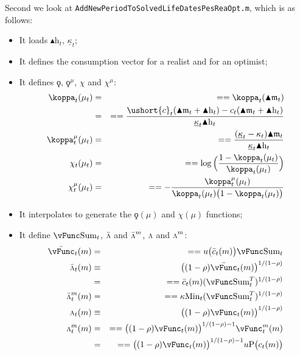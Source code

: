 \documentclass[titlepage,abstract]{\econtex}
\providecommand{\kappaMin}{\kappa\text{Min}}
\providecommand{\vSum}{\vFunc\text{Sum}}
\providecommand{\Deltah}{\blacktriangle \mathrm{h}}
\providecommand{\Deltam}{\blacktriangle \mathfrak{m}}
\providecommand{\vInv}{\ensuremath{\scriptstyle \Lambda \displaystyle}}
\begin{document}
Second we look at \texttt{AddNewPeriodToSolvedLifeDatesPesReaOpt.m}, which is as follows:
        \begin{itemize}
        \item It loads $\Deltah_{t}$, $\underline{\kappa}_{t}$;
        \item It defines the consumption vector for a realist and for an optimist;
        \item It defines $\ensuremath{\koppa}$, $\ensuremath{\koppa}^{\mu}$, $\chi$ and $\chi^{\mu}$:
            \begin{equation}\begin{gathered}\begin{aligned}
            \koppa_{t} (\mu_{t})   &=& =  =  \koppa_{t} (\Deltam_{t}) \\
              &=& =  =  \frac{\ushort{c}_{t}(\Deltam_{t} + \Deltah_{t})-c_{t}(\Deltam_{t} + \Deltah _{t})}{\underline{\kappa}_{t} \Deltah_{t}} \\
            \koppa_{t}^{\mu} (\mu_{t})   &=& =  =  \frac{(\underline{\kappa}_{t}-\kappa_{t}) \Deltam_{t}}{\underline{\kappa}_{t} \Deltah_{t}} \\
            \chi_{t} (\mu_{t})   &=& =  =  \log\Big(\frac{1-\koppa_{t} (\mu_{t})}{\koppa_{t} (\mu_{t}) }\Big) \\
            \chi_{t}^{\mu} (\mu_{t})   &=& =  =  -\frac{\koppa_{t}^{\mu}(\mu_{t})}{\koppa_{t} (\mu_{t})\big(1-\koppa_{t} (\mu_{t})\big)}
            \end{aligned}\end{gathered}\end{equation}
        \item It interpolates to generate the $\ensuremath{\koppa}(\mu)$ and $\chi(\mu)$ functions;
        \item It define $\vSum_{t}$, $\bar{\vInv}$ and $\bar{\vInv}^{m}$, $\vInv$ and $\vInv^{m}$:
            \begin{equation}\begin{gathered}\begin{aligned}
            \bar{\vFunc}_{t} (m)   &=& =  =  u\big(\bar{c}_{t}(m)\big) \vSum_{t} \\
            \bar{\vInv}_{t} (m) &\equiv&
            \big((1-\rho)\bar{\vFunc}_{t} (m)\big)^{1/(1-\rho)} \\
              &=& =  = \bar{c}_{t}(m) (\vSum_{t}^{T})^{1/(1-\rho)} \\
            \bar{\vInv}_{t}^{m} (m)   &=& =  = 
            \kappaMin_{t} (\vSum_{t}^{T})^{1/(1-\rho)} \\
            \vInv_{t} (m) &\equiv&
            \big((1-\rho)\vFunc_{t} (m)\big)^{1/(1-\rho)} \\
            \vInv_{t}^{m} (m)   &=& =  = 
            \big((1-\rho)\vFunc_{t} (m)\big)^{1/(1-\rho)-1} \vFunc_{t}^{m} (m)\\
              &=& =  = 
            \big((1-\rho)\vFunc_{t} (m)\big)^{1/(1-\rho)-1} u\text{P}\big(c_{t}(m)\big) \\
            \end{aligned}\end{gathered}\end{equation}


\end{itemize}
\end{document}
